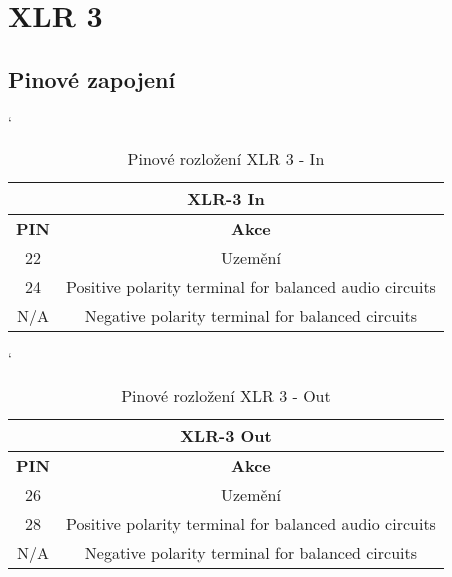 
\section{XLR 3}
\subsection{Pinové zapojení}
\begin{table} [h!]
	\centering
	\catcode` %
	\begin{tabular}[c]{|| c | c ||}
	\hline
		\multicolumn{2}{||c||}{XLR-3 In} \\
	\hline
 		 \textbf{PIN} & \textbf{Akce}\\
	\hline
		22 &  Uzemění\\
	\hline
		24 & Positive polarity terminal for balanced audio circuits \\
	\hline
		N/A & Negative polarity terminal for balanced circuits \\
	\hline
	\end{tabular}
	\caption{Pinové rozložení XLR 3 - In}
	\label{table:pinXLR-IN}
\end{table}

\begin{table} [h!]
	\centering
	\catcode`
	\begin{tabular}[c]{|| c | c ||}
	\hline
		\multicolumn{2}{||c||}{XLR-3 Out} \\
	\hline
 		 \textbf{PIN} & \textbf{Akce}\\
	\hline
		26 &  Uzemění\\
	\hline
		28 & Positive polarity terminal for balanced audio circuits \\
	\hline
		N/A & Negative polarity terminal for balanced circuits \\
	\hline
	\end{tabular}
	\caption{Pinové rozložení XLR 3 - Out}
	\label{table:pinXLR-OUT}
\end{table}